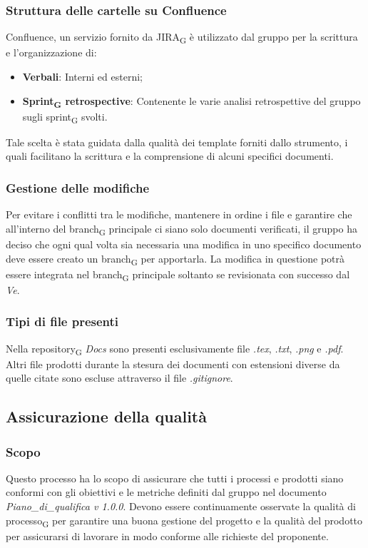 \subsubsection{Struttura delle cartelle su Confluence}
Confluence, un servizio fornito da JIRA\textsubscript{G} è utilizzato dal gruppo per la scrittura e l'organizzazione di:
\begin{itemize}
	\item \textbf{Verbali}: Interni ed esterni;
	\item \textbf{Sprint\textsubscript{G} retrospective}: Contenente le varie analisi retrospettive del gruppo sugli sprint\textsubscript{G} svolti.
\end{itemize}
Tale scelta è stata guidata dalla qualità dei template forniti dallo strumento, i quali facilitano la scrittura e la comprensione di alcuni specifici documenti.

\subsubsection{Gestione delle modifiche}
Per evitare i conflitti tra le modifiche, mantenere in ordine i file e garantire che all'interno del branch\textsubscript{G} principale ci siano solo documenti verificati, il gruppo ha deciso che ogni qual volta sia necessaria una modifica in uno specifico documento deve essere creato un branch\textsubscript{G} per apportarla. La modifica in questione potrà essere integrata nel branch\textsubscript{G} principale soltanto se revisionata con successo dal \textit{Ve}.

\subsubsection{Tipi di file presenti}
Nella repository\textsubscript{G} \textit{Docs} sono presenti esclusivamente file \textit{.tex}, \textit{.txt}, \textit{.png} e \textit{.pdf}. Altri file prodotti durante la stesura dei documenti con estensioni diverse da quelle citate sono escluse attraverso il file \textit{.gitignore}.



\subsection{Assicurazione della qualità}
\subsubsection{Scopo}
Questo processo ha lo scopo di assicurare che tutti i processi e prodotti siano conformi con gli obiettivi e le metriche definiti dal gruppo nel documento \textit{Piano\_di\_qualifica v 1.0.0}. 
Devono essere continuamente osservate la qualità di processo\textsubscript{G} per garantire una buona gestione del progetto e la qualità del prodotto per assicurarsi di lavorare in modo conforme alle richieste del proponente.
